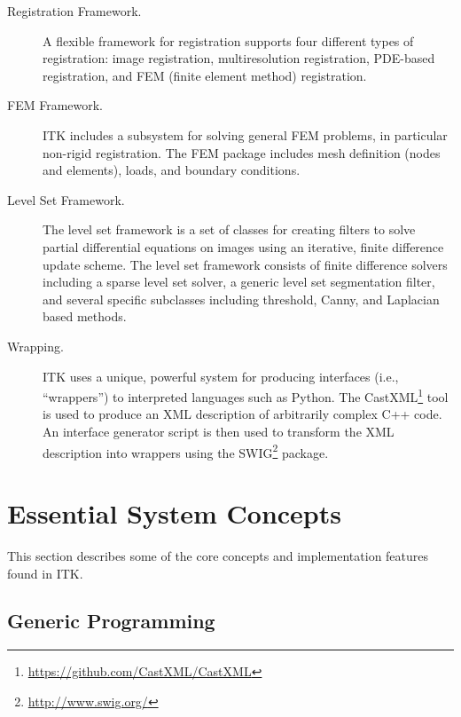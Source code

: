 \begin{description}
  \item[Registration Framework.] A flexible framework for registration
        supports four different types of registration: image registration,
        multiresolution registration, PDE-based registration, and FEM (finite
        element method) registration.

  \item[FEM Framework.] ITK includes a subsystem for solving general
        FEM problems, in particular non-rigid registration. The FEM package
        includes mesh definition (nodes and elements), loads, and boundary
        conditions.

  \item[Level Set Framework.] The level set framework is a set of
        classes for creating filters to solve partial differential equations
        on images using an iterative, finite difference update scheme. The
        level set framework consists of finite difference solvers including a
        sparse level set solver, a generic level set segmentation filter, and
        several specific subclasses including threshold, Canny, and Laplacian
        based methods.

  \item[Wrapping.] ITK uses a unique, powerful system for producing interfaces
        (i.e., ``wrappers'') to interpreted languages such as Python. The
        CastXML\footnote{\url{https://github.com/CastXML/CastXML}}
        tool is used to produce an XML description of arbitrarily complex C++
        code. An interface generator script is then used to transform the XML
        description into wrappers using the
        SWIG\footnote{\url{http://www.swig.org/}} package.

\end{description}


\section{Essential System Concepts}
\label{sec:EssentialSystemConcepts}

This section describes some of the core concepts and implementation features
found in ITK.

\subsection{Generic Programming}
\label{sec:GenericProgramming}


